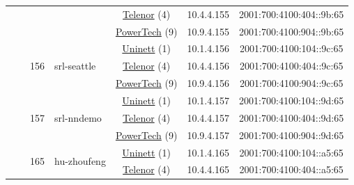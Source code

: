 \begin{small}
\begin{center}
\begin{longtable}{|c|c|c|c|c|c|c|c|}
  &  &  &  & \multicolumn{2}{|c|}{\tiny{\href{https://www.telenor.no}{Telenor} (4)}} & \tiny{10.4.4.155} & \tiny{2001:700:4100:404::9b:65} \\* \cline{5-5}\cline{6-6}\cline{7-7}\cline{8-8}
  &  &  &  & \multicolumn{2}{|c|}{\tiny{\href{http://www.powertech.no}{PowerTech} (9)}} & \tiny{10.9.4.155} & \tiny{2001:700:4100:904::9b:65} \\* \cline{3-3}\cline{4-4}\cline{5-5}\cline{6-6}\cline{7-7}\cline{8-8}
  &  & \multirow{3}{*}{\tiny{156}} & \multicolumn{1}{|l|}{\multirow{3}{*}{\tiny{srl-seattle}}} & \multicolumn{2}{|c|}{\tiny{\href{https://www.uninett.no}{Uninett} (1)}} & \tiny{10.1.4.156} & \tiny{2001:700:4100:104::9c:65} \\* \cline{5-5}\cline{6-6}\cline{7-7}\cline{8-8}
  &  &  &  & \multicolumn{2}{|c|}{\tiny{\href{https://www.telenor.no}{Telenor} (4)}} & \tiny{10.4.4.156} & \tiny{2001:700:4100:404::9c:65} \\* \cline{5-5}\cline{6-6}\cline{7-7}\cline{8-8}
  &  &  &  & \multicolumn{2}{|c|}{\tiny{\href{http://www.powertech.no}{PowerTech} (9)}} & \tiny{10.9.4.156} & \tiny{2001:700:4100:904::9c:65} \\* \cline{3-3}\cline{4-4}\cline{5-5}\cline{6-6}\cline{7-7}\cline{8-8}
  &  & \multirow{3}{*}{\tiny{157}} & \multicolumn{1}{|l|}{\multirow{3}{*}{\tiny{srl-nndemo}}} & \multicolumn{2}{|c|}{\tiny{\href{https://www.uninett.no}{Uninett} (1)}} & \tiny{10.1.4.157} & \tiny{2001:700:4100:104::9d:65} \\* \cline{5-5}\cline{6-6}\cline{7-7}\cline{8-8}
  &  &  &  & \multicolumn{2}{|c|}{\tiny{\href{https://www.telenor.no}{Telenor} (4)}} & \tiny{10.4.4.157} & \tiny{2001:700:4100:404::9d:65} \\* \cline{5-5}\cline{6-6}\cline{7-7}\cline{8-8}
  &  &  &  & \multicolumn{2}{|c|}{\tiny{\href{http://www.powertech.no}{PowerTech} (9)}} & \tiny{10.9.4.157} & \tiny{2001:700:4100:904::9d:65} \\* \cline{3-3}\cline{4-4}\cline{5-5}\cline{6-6}\cline{7-7}\cline{8-8}
  &  & \multirow{3}{*}{\tiny{165}} & \multicolumn{1}{|l|}{\multirow{3}{*}{\tiny{hu-zhoufeng}}} & \multicolumn{2}{|c|}{\tiny{\href{https://www.uninett.no}{Uninett} (1)}} & \tiny{10.1.4.165} & \tiny{2001:700:4100:104::a5:65} \\* \cline{5-5}\cline{6-6}\cline{7-7}\cline{8-8}
  &  &  &  & \multicolumn{2}{|c|}{\tiny{\href{https://www.telenor.no}{Telenor} (4)}} & \tiny{10.4.4.165} & \tiny{2001:700:4100:404::a5:65} \\* \cline{5-5}\cline{6-6}\cline{7-7}\cline{8-8}

\end{longtable}
\end{center}
\end{small}
